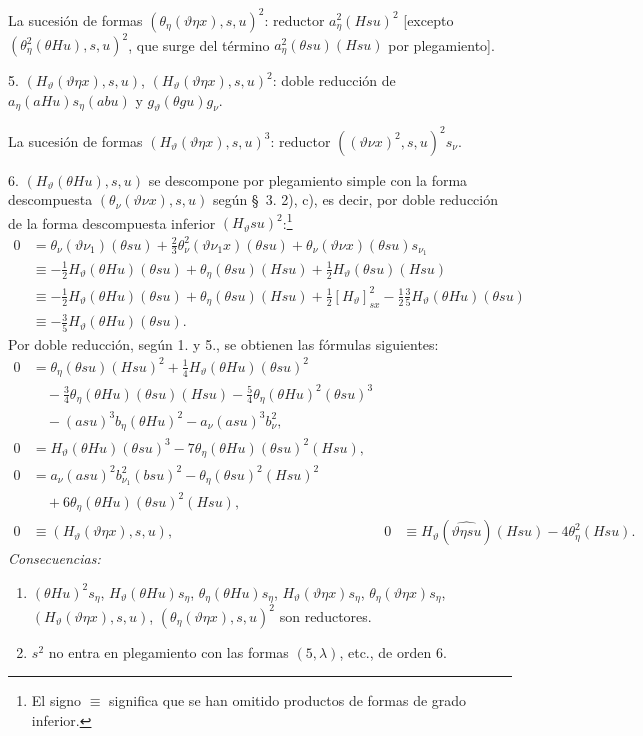 \documentclass[11pt]{article}
\begin{document}
La sucesión de formas $(\theta_\eta(\vartheta\eta x),s,u)^2$: reductor $a_\eta^2(Hsu)^2$ [excepto $(\theta_\eta^2(\theta Hu),s,u)^2$, que surge del término $a_\eta^2(\theta su)(Hsu)$ por plegamiento].

5. $(H_\vartheta(\vartheta\eta x),s,u)$, $(H_\vartheta(\vartheta\eta x),s,u)^2$: doble reducción de $a_\eta(aHu)s_\eta(abu)$ y $g_\vartheta(\theta gu)g_\nu$.

La sucesión de formas $(H_\vartheta(\vartheta\eta x),s,u)^3$: reductor $((\vartheta\nu x)^2,s,u)^2s_\nu$.

6. $(H_\vartheta(\theta Hu),s,u)$ se descompone por plegamiento simple con la forma descompuesta $(\theta_\nu(\vartheta\nu x),s,u)$ según \S\ 3. 2), c), es decir, por doble reducción de la forma descompuesta inferior $(H_\vartheta su)^2$:\footnote{El signo $\equiv$ significa que se han omitido productos de formas de grado inferior.}
\begin{align*}
0&=\theta_\nu(\vartheta\nu_1)(\theta su)+\frac23\theta_\nu^2(\vartheta\nu_1x)(\theta su)+\theta_\nu(\vartheta\nu x)(\theta su)s_{\nu_1}\\
&\equiv -\frac12H_\vartheta(\theta Hu)(\theta su)+\theta_\eta(\theta su)(Hsu)+\frac12H_\vartheta(\theta su)(Hsu)\\
&\equiv -\frac12H_\vartheta(\theta Hu)(\theta su)+\theta_\eta(\theta su)(Hsu)+\frac12[H_\vartheta]_{sx}^2-\frac12\frac35H_\vartheta(\theta Hu)(\theta su)\\
&\equiv -\frac35H_\vartheta(\theta Hu)(\theta su).
\end{align*}
Por doble reducción, según 1. y 5., se obtienen las fórmulas siguientes:
\begin{equation}
\tag{31}
\begin{aligned}
0&=\theta_\eta(\theta su)(Hsu)^2+\frac14H_\vartheta(\theta Hu)(\theta su)^2\\
&\quad-\frac34\theta_\eta(\theta Hu)(\theta su)(Hsu)-\frac54\theta_\eta(\theta Hu)^2(\theta su)^3\\
&\quad-(asu)^3b_\eta(\theta Hu)^2-a_\nu(asu)^3b_\nu^2,\\
0&=H_\vartheta(\theta Hu)(\theta su)^3-7\theta_\eta(\theta Hu)(\theta su)^2(Hsu),\\
0&=a_\nu(asu)^2b_{\nu_1}^{2}(bsu)^2-\theta_\eta(\theta su)^2(Hsu)^2\\
&\quad+6\theta_\eta(\theta Hu)(\theta su)^2(Hsu),\\
0&\equiv (H_\vartheta(\vartheta\eta x),s,u),
&0&\equiv H_\vartheta(\widehat{\vartheta\eta su})(Hsu)-4\theta_\eta^2(Hsu).
\end{aligned}
\end{equation}
\noindent\emph{Consecuencias:}
\begin{enumerate}
\item $(\theta Hu)^2s_\eta$, $H_\vartheta(\theta Hu)s_\eta$, $\theta_\eta(\theta Hu)s_\eta$, $H_\vartheta(\vartheta\eta x)s_\eta$, $\theta_\eta(\vartheta\eta x)s_\eta$, $(H_\vartheta(\vartheta\eta x),s,u)$, $(\theta_\eta(\vartheta\eta x),s,u)^2$ son reductores.
\item $s^2$ no entra en plegamiento con las formas $(5,\lambda)$, etc., de orden 6.
\end{enumerate}
\end{document}
